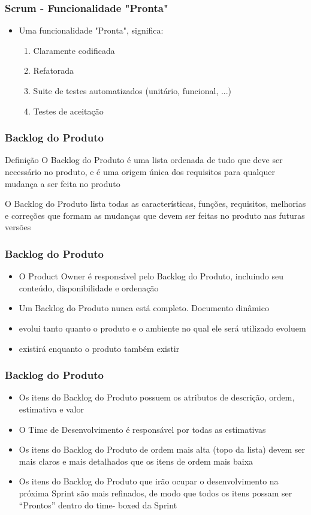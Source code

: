 \begin{frame}
 \frametitle{Scrum - Funcionalidade "Pronta"}
 \begin{itemize}
  \item Uma funcionalidade "Pronta", significa:
  \begin{enumerate}
   \item Claramente codificada
   \item Refatorada
   \item Suite de testes automatizados (unitário, funcional, ...)
   \item Testes de aceitação
  \end{enumerate}
 \end{itemize}
\end{frame} 

\begin{frame}
 \frametitle{Backlog do Produto}
\begin{block}{Definição}
O Backlog do Produto é uma lista ordenada de tudo que deve ser necessário no produto, e é
uma origem única dos requisitos para qualquer mudança a ser feita no produto
 \end{block}
 \begin{block}{}
 O Backlog do Produto lista todas as características, funções, requisitos, melhorias e correções
que formam as mudanças que devem ser feitas no produto nas futuras versões
 \end{block}
\end{frame}

\begin{frame}
 \frametitle{Backlog do Produto}
 \begin{itemize}
 \item O Product Owner é responsável pelo Backlog do Produto, incluindo seu conteúdo, disponibilidade e
ordenação
  \item Um Backlog do Produto nunca está completo. Documento dinâmico
  \item evolui tanto quanto o produto e o ambiente no qual ele será utilizado evoluem
  \item existirá enquanto o produto também existir
 \end{itemize}
\end{frame}

\begin{frame}
 \frametitle{Backlog do Produto}
 \begin{itemize}
 \item Os itens do Backlog do Produto possuem os atributos de descrição, ordem, estimativa e valor
   \item O Time de Desenvolvimento é responsável por todas as estimativas
  \item Os itens do Backlog do Produto de ordem mais alta (topo da lista) devem ser mais claros e
mais detalhados que os itens de ordem mais baixa
  \item Os itens do Backlog do Produto que irão ocupar o desenvolvimento na próxima
Sprint são mais refinados, de modo que todos os itens possam ser “Prontos” dentro do time-
boxed da Sprint
 \end{itemize}
\end{frame}

